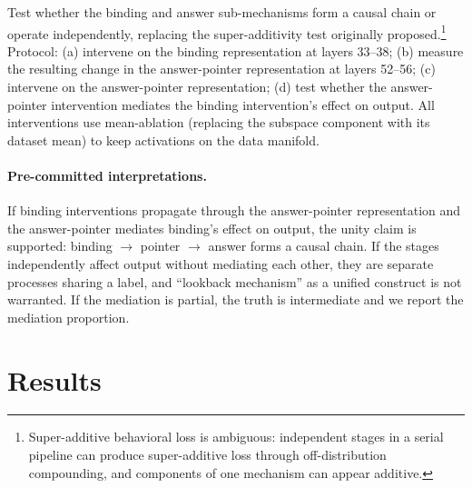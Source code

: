 \documentclass{article}
\begin{document}
Test whether the binding and answer sub-mechanisms form a causal chain or operate independently, replacing the super-additivity test originally proposed.\footnote{Super-additive behavioral loss is ambiguous: independent stages in a serial pipeline can produce super-additive loss through off-distribution compounding, and components of one mechanism can appear additive.} Protocol: (a) intervene on the binding representation at layers 33--38; (b) measure the resulting change in the answer-pointer representation at layers 52--56; (c) intervene on the answer-pointer representation; (d) test whether the answer-pointer intervention mediates the binding intervention's effect on output. All interventions use mean-ablation (replacing the subspace component with its dataset mean) to keep activations on the data manifold.

\paragraph{Pre-committed interpretations.} If binding interventions propagate through the answer-pointer representation and the answer-pointer mediates binding's effect on output, the unity claim is supported: binding $\to$ pointer $\to$ answer forms a causal chain. If the stages independently affect output without mediating each other, they are separate processes sharing a label, and ``lookback mechanism'' as a unified construct is not warranted. If the mediation is partial, the truth is intermediate and we report the mediation proportion.


\section{Results}
\end{document}
